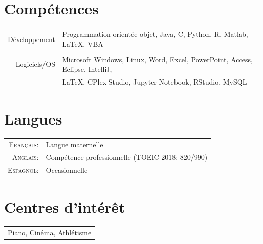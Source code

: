 \documentclass[a4paper,10pt]{article}
\begin{document}
\section{Compétences}
\begin{tabular}{rl}	
Développement & Programmation orientée objet, Java, C, Python, R, Matlab, \LaTeX, VBA\\&\\

Logiciels/OS & Microsoft Windows, Linux, Word, Excel, PowerPoint, Access, Eclipse, IntelliJ,\\& LaTeX, CPlex Studio, Jupyter Notebook, RStudio, MySQL
\end{tabular}

\section{Langues}
\begin{tabular}{rl}
\textsc{Français:}&Langue maternelle\\
\textsc{Anglais:}&Compétence professionnelle (TOEIC 2018: 820/990)\\
\textsc{Espagnol:}&Occasionnelle
\end{tabular}

\section{Centres d'intérêt}
\begin{tabular}{l}
\small{Piano, Cinéma, Athlétisme}
\end{tabular}


\end{document}
